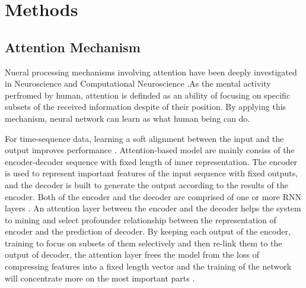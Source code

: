 \documentclass[journal]{IEEEtran}
\begin{document}


\section{Methods}

\subsection{Attention Mechanism}
Nueral processing mechanisms involving attention have been deeply investigated in Neuroscience and Computational Neuroscience \cite{itti1998model,desimone1995neural}.As the mental activity perfromed by human, attention is definded as an ability of focusing on specific subsets of the received information despite of their position. By applying this mechanism, neural network can learn as what human being can do\cite{zhou2016attention,bahdanau2014neural}.

For time-sequence data, learning a soft alignment between the input and the output improves performance \cite{bahdanau2014neural}. Attention-based model are mainly consiss of the encoder-decoder sequence with fixed length of inner representation. The encoder is used to represent important features of the input sequence with fixed outputs, and the decoder is built to generate the output according to the results of the encoder. Both of the encoder and the decoder are comprised of one or more RNN layers \cite{prabhavalkar2017analysis}. An attention layer between the encoder and the decoder helps the system to mining and select profounder relationship between the representation of encoder and the prediction of decoder. By keeping each output of the encoder, training to focus on subsets of them selectively and then re-link them to the output of decoder, the attention layer frees the model from the loss of compressing features into a fixed length vector and the training of the network will concentrate more on the most important parts \cite{bahdanau2014neural} .
\end{document}

